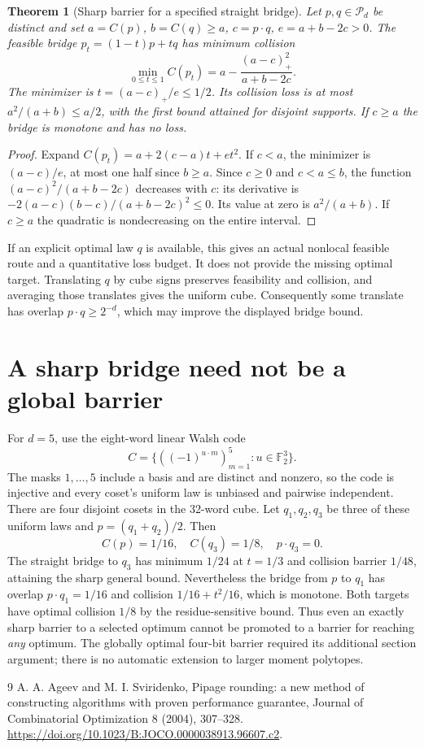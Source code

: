 \documentclass[11pt]{article}
\newtheorem{theorem}{Theorem}
\begin{document}
\begin{theorem}[Sharp barrier for a specified straight bridge]
Let $p,q\in\mathcal P_d$ be distinct and set
$a=C(p)$, $b=C(q)\ge a$, $c=p\cdot q$, $e=a+b-2c>0$.
The feasible bridge $p_t=(1-t)p+tq$ has minimum collision
\[
 \min_{0\le t\le1}C(p_t)
 =a-\frac{(a-c)_+^2}{a+b-2c}.
\]
The minimizer is $t=(a-c)_+/e\le1/2$. Its collision loss is at most
$a^2/(a+b)\le a/2$, with the first bound attained for disjoint
supports. If $c\ge a$ the bridge is monotone and has no loss.
\end{theorem}
\begin{proof}
Expand $C(p_t)=a+2(c-a)t+et^2$. If $c<a$, the minimizer is
$(a-c)/e$, at most one half since $b\ge a$. Since $c\ge0$ and
$c<a\le b$, the function $(a-c)^2/(a+b-2c)$ decreases with $c$:
its derivative is $-2(a-c)(b-c)/(a+b-2c)^2\le0$.
Its value at zero is $a^2/(a+b)$. If $c\ge a$ the quadratic is
nondecreasing on the entire interval.
\end{proof}
If an explicit optimal law $q$ is available, this gives an actual
nonlocal feasible route and a quantitative loss budget. It does not
provide the missing optimal target. Translating $q$ by cube signs
preserves feasibility and collision, and averaging those translates
gives the uniform cube. Consequently some translate has overlap
$p\cdot q\ge2^{-d}$, which may improve the displayed bridge bound.

\section*{A sharp bridge need not be a global barrier}
For $d=5$, use the eight-word linear Walsh code
\[
 C=\{((-1)^{u\cdot m})_{m=1}^5:u\in\mathbb F_2^3\}.
\]
The masks $1,\ldots,5$ include a basis and are distinct and nonzero,
so the code is injective and every coset's uniform law is unbiased
and pairwise independent. There are four disjoint cosets in the
32-word cube. Let $q_1,q_2,q_3$ be three of these uniform laws and
$p=(q_1+q_2)/2$. Then
\[
 C(p)=1/16,\quad C(q_3)=1/8,\quad p\cdot q_3=0.
\]
The straight bridge to $q_3$ has minimum $1/24$ at $t=1/3$ and
collision barrier $1/48$, attaining the sharp general bound.
Nevertheless the bridge from $p$ to $q_1$ has overlap $p\cdot q_1=1/16$
and collision $1/16+t^2/16$, which is monotone. Both targets have
optimal collision $1/8$ by the residue-sensitive bound.
Thus even an exactly sharp barrier to a selected optimum cannot be
promoted to a barrier for reaching \emph{any} optimum. The globally
optimal four-bit barrier required its additional section argument;
there is no automatic extension to larger moment polytopes.

\begin{thebibliography}{9}
 A. A. Ageev and M. I. Sviridenko, Pipage rounding:
a new method of constructing algorithms with proven performance
guarantee, Journal of Combinatorial Optimization 8 (2004), 307--328.
\url{https://doi.org/10.1023/B:JOCO.0000038913.96607.c2}.
\end{thebibliography}
\end{document}
